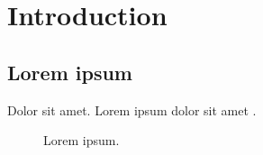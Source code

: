 \documentclass[main.tex]{subfiles}
\begin{document}
\section{Introduction}

\subsection{Lorem ipsum}

Dolor sit amet\cite{LoremIpsum2018}. Lorem ipsum dolor sit amet .

\begin{figure}[H]
    \centering
    \caption{Lorem ipsum. \label{fig:lorem}}
\end{figure}
\end{document}
